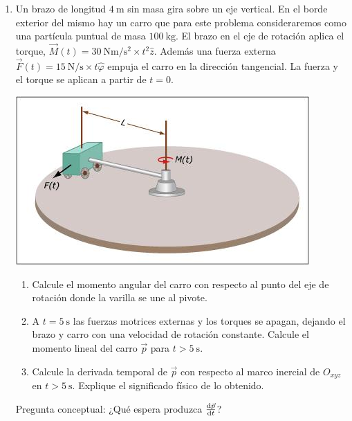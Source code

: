 \documentclass[11pt,spanish,a4paper]{article}
\begin{document}
\begin{enumerate}
\item
\begin{minipage}[t][4.5cm]{0.5\textwidth}
Un brazo de longitud $\SI{4}{\metre}$ sin masa gira sobre un eje vertical.
En el borde exterior del mismo hay un carro que para este problema consideraremos como una partícula puntual de masa $\SI{100}{\kilo\gram}$.
El brazo en el eje de rotación aplica el torque, $\vec{M}(t)= \SI{30}{\newton\metre\per\second\squared} \times t^2 \hat{z}$.
Además una fuerza externa $\vec{F}(t)= \SI{15}{\newton\per\second} \times t \hat{\varphi}$ empuja el carro en la dirección tangencial.
La fuerza y el torque se aplican a partir de $t=0$.
\end{minipage}
\begin{minipage}[c][2cm][t]{0.45\textwidth}
	\includegraphics[width=\textwidth]{MIT2_003SCF11_pset3_e05}
\end{minipage}

\begin{enumerate}[label=\alph*)]
	\item Calcule el momento angular del carro con respecto al punto del eje de rotación donde la varilla se une al pivote.
	\item A $t= \SI{5}{\second}$ las fuerzas motrices externas y los torques se apagan, dejando el brazo y carro con una velocidad de rotación constante.
	Calcule el momento lineal del carro $\vec{p}$ para $t>\SI{5}{\second}$.
	\item Calcule la derivada temporal de $\vec{p}$ con respecto al marco inercial de $O_{xyz}$ en $t> \SI{5}{\second}$.
	Explique el significado físico de lo obtenido.
\end{enumerate}

Pregunta conceptual:
¿Qué espera produzca $\dv{\vec{p}}{t}$?


\end{enumerate}
\end{document}
